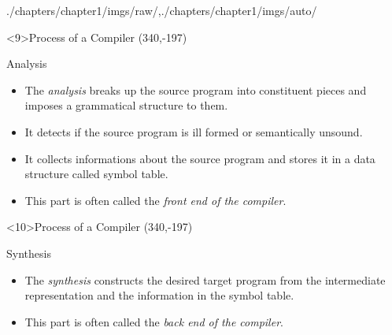 \begin{graphicspathcontext}{{./chapters/chapter1/imgs/raw/},{./chapters/chapter1/imgs/auto/}}
\begin{bibunit}[apalike]
\sectiontableofcontentslide

\begin{frame}<9>{Process of a Compiler}
	\putat*(340,-197){}
	\begin{minipage}{.8\linewidth}
	\begin{block}{Analysis}
	\begin{itemize}
	\item The \emph{analysis} breaks up the source program into constituent pieces and imposes a grammatical structure to them.
	\item It detects if the source program is ill formed or semantically unsound.
	\item It collects informations about the source program and stores it in a data structure called symbol table.
	\item This part is often called the \emph{front end of the compiler}.
	\end{itemize}
	\end{block}
	\end{minipage}
\end{frame}

\begin{frame}<10>{Process of a Compiler}
	\putat*(340,-197){}
	\begin{minipage}{.8\linewidth}
	\begin{block}{Synthesis}
	\begin{itemize}
	\item The \emph{synthesis} constructs the desired target program from the intermediate representation and the information in the symbol table.
	\item This part is often called the \emph{back end of the compiler}.
	\end{itemize}
	\end{block}
	\end{minipage}
\end{frame}


\end{bibunit}
\end{graphicspathcontext}
